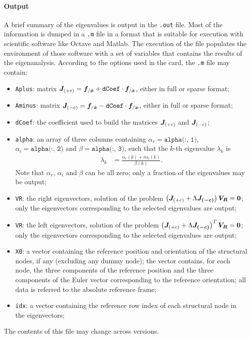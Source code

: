 \paragraph{Output}
A brief summary of the eigenvalues is output in the \texttt{.out} file.
Most of the information is dumped in a \texttt{.m} file in a format
that is suitable for execution with scientific software like
Octave and Matlab.
The execution of the file populates the environment of those software
with a set of variables that contains the results of the eigenanalysis.
According to the options used in the  card,
the \texttt{.m} file may contain:
\begin{itemize}
\item \texttt{Aplus}: 
matrix
$\boldsymbol{J}_{(+c)} = \boldsymbol{f}_{/\dot{\boldsymbol{x}}} + \texttt{dCoef} \cdot \boldsymbol{f}_{/\boldsymbol{x}}$,
either in full or sparse format;

\item \texttt{Aminus}: 
matrix
$\boldsymbol{J}_{(-c)} = \boldsymbol{f}_{/\dot{\boldsymbol{x}}} - \texttt{dCoef} \cdot \boldsymbol{f}_{/\boldsymbol{x}}$,
either in full or sparse format;

\item \texttt{dCoef}: the coefficient used to build the matrices
$\boldsymbol{J}_{(+c)}$ and $\boldsymbol{J}_{(-c)}$;

\item \texttt{alpha}:
an array of three columns containing
$\alpha_r = \texttt{alpha(:, 1)}$,
$\alpha_i = \texttt{alpha(:, 2)}$
and $\beta = \texttt{alpha(:, 3)}$,
such that the $k$-th eigenvalue $\lambda_k$ is
\begin{align}
	\lambda_k
	&=
	\frac{\alpha_r(k) + i \alpha_i(k)}{\beta(k)}
	.
\end{align}
Note that $\alpha_r$, $\alpha_i$ and $\beta$ can be all zero;
only a fraction of the eigenvalues may be output;

\item \texttt{VR}: the right eigenvectors, solution of the problem
$\left( \boldsymbol{J}_{(+c)} + \Lambda \boldsymbol{J_{(-c)}} \right)\boldsymbol{V_R}=\boldsymbol{0}$;
only the eigenvectors corresponding to the selected eigenvalues are output;

\item \texttt{VR}: the left eigenvectors, solution of the problem
$\left( \boldsymbol{J}_{(+c)} + \Lambda \boldsymbol{J_{(-c)}} \right)^T\boldsymbol{V_R}=\boldsymbol{0}$;
only the eigenvectors corresponding to the selected eigenvalues are output;

\item \texttt{X0}: a vector containing the reference position
and orientation of the structural nodes, if any (excluding any dummy node);
the vector contains, for each node, the three components
of the reference position and the three components of the Euler vector
corresponding to the reference orientation; all data is referred
to the absolute reference frame;

\item \texttt{idx}: a vector containing the reference row index
of each structural node in the eigenvectors;
\end{itemize}
The contents of this file may change across versions.

